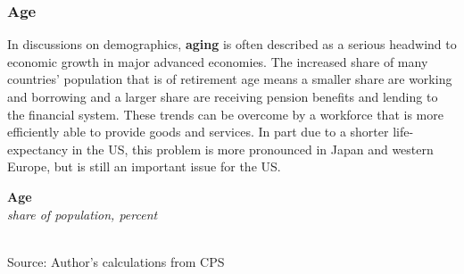 \documentclass{report}
\newcommand{\barylab}[2]{yticklabel style={text width=#1, align=right, 
		style={black!70}, text height=#2},}
\newcommand{\bbar}[2]{extra #1 ticks = {{#2}}, extra #1 tick labels = ,
		extra #1 tick style = {grid=major, grid style={thick, black!25}},}
\newcommand{\barplotnogrid}{xbar=0pt, axis line style={draw=none},
	    yticklabel style={align=left, anchor=east},
      		xmajorticks=false, ymajorgrids=false,   
	    ytick=data, tickwidth=0pt, area legend, reverse legend,
	    nodes near coords, nodes near coords align={horizontal},}
\begin{document}
{{{\begin{minipage}{0.76\textwidth}
\end{minipage}

\newpage

\begin{minipage}{0.76\textwidth}

\subsubsection*{\color{black!70} \seriffont Age}

\small In discussions on demographics, \textbf{aging} is often described as a serious headwind to economic growth in major advanced economies. The increased share of many countries' population that is of retirement age means a smaller share are working and borrowing and a larger share are receiving pension benefits and lending to the financial system. These trends can be overcome by a workforce that is more efficiently able to provide goods and services. In part due to a shorter life-expectancy in the US, this problem is more pronounced in Japan and western Europe, but is still an important issue for the US.

\end{minipage}

\begin{minipage}{0.32\textwidth}
\noindent \normalsize \textbf{Age}\\
\footnotesize{\textit{share of population, percent}}\\
\noindent \hspace*{-4mm} \\
\footnotesize{Source: Author's calculations from CPS}
\end{minipage} \hspace{4mm}
\begin{minipage}{0.4\textwidth}
\small 
\end{minipage}


}}}
\end{document}
